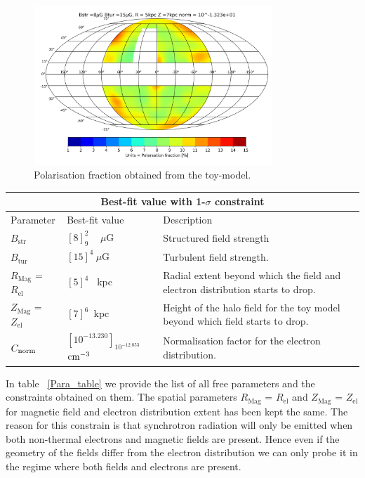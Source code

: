 \documentclass[12pt, a4 paper]{article}
\begin{document}
\begin{figure}[h!]
        \centering
        \includegraphics[width =9cm]{Images/Jan-09-2022Pol_Frac_30GHz_Total_Skymap_Bstr_8_Btur_15_Rmag_5_Zmag_7_norm_-1.32e+01.png}%
    \caption{Polarisation fraction obtained from the toy-model.}
    \label{fig:Pol_Frac}
\end{figure}

\label{Para_table}
\begin{center}
\begin{tabular}{ |p{}|p{4cm}|p{4cm}|  }
\hline
\multicolumn{3}{|c|}{Best-fit value with 1-$\sigma$ constraint} \\
\hline
Parameter & Best-fit value &Description \\
\hline
\hline
$B_{\mathrm{str}} $& $[8]^{2}_{9}$ ~ $\mu$G & Structured field strength \\
\hline
$B_{\mathrm{tur}} $& $ [15]^{4}_{} ~\mu$G & Turbulent field strength.\\
\hline
$R_{\mathrm{Mag}}$ = $R_{\mathrm{el}}$ & $[5]^{4}_{}$ ~kpc & Radial extent beyond which the field and electron distribution starts to drop. \\
\hline
$Z_{\mathrm{Mag}}$ = $Z_{\mathrm{el}}$ & $[7]^{6}_{}$~kpc & Height of the halo field for the toy model beyond which field starts to drop.\\
\hline
$C_{\rm norm}$ & $[10^{-13.230}]_{10^{-12.053}}$ ${\rm cm}^{-3}$ & Normalisation factor for the electron distribution.\\
\hline
\end{tabular}
\end{center}

In table ~\ref{Para_table} we provide the list of all free parameters and the constraints obtained on them. The spatial parameters $R_{\mathrm{Mag}}$ = $R_{\mathrm{el}}$ and $Z_{\mathrm{Mag}}$ = $Z_{\mathrm{el}}$ for magnetic field and electron distribution extent has been kept the same. The reason for this constrain is that synchrotron radiation will only be emitted when both non-thermal electrons and magnetic fields are present. Hence even if the geometry of the fields differ from the electron distribution we can only probe it in the regime where both fields and electrons are present.
\newline
\end{document}
